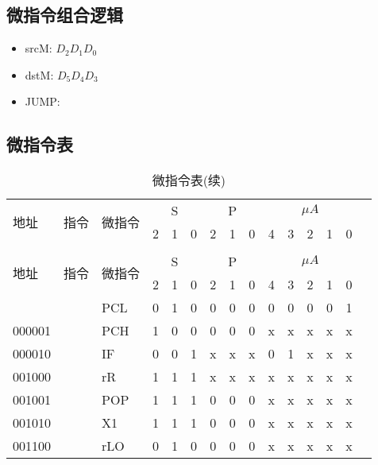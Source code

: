 \documentclass[10pt]{book}
\begin{document}
\subsection{微指令组合逻辑}
\begin{itemize}
  \item srcM: $D_{2}D_{1}D_{0}$
  \item dstM: $D_{5}D_{4}D_{3}$
  \item JUMP: 
\end{itemize}

\subsection{微指令表}
\begin{longtable}{|l|l|l|c|c|c|c|c|c|c|c|c|c|c|c|}
\caption{微指令表} \label{tb_micro_prog} \\
\hline
\multirow{2}{1cm}{地址} & \multirow{2}{1.5cm}{指令} & \multirow{2}{1.5cm}{微指令} & \multicolumn{3}{c|}{S} & \multicolumn{3}{c|}{P} & \multicolumn {5}{c|}{$\mu A$} \\
\cline{4-14}
                       &             &             & 2 & 1 & 0 & 2 & 1 & 0 & 4 & 3 & 2 & 1 & 0 \\
\hline
\endfirsthead
\caption{微指令表(续)} \\
\hline
\multirow{2}{1cm}{地址} & \multirow{2}{1.5cm}{指令} & \multirow{2}{1.5cm}{微指令} & \multicolumn{3}{c|}{S} & \multicolumn{3}{c|}{P} & \multicolumn {5}{c|}{$\mu A$} \\
\cline{4-14}
                       &             &             & 2 & 1 & 0 & 2 & 1 & 0 & 4 & 3 & 2 & 1 & 0 \\
\hline
\endhead
\hline
\endfoot
000000	&  			& PCL		& 0 & 1 & 0   & 0 & 0 & 0   & 0 & 0 & 0 & 0 & 1 \\
000001 	& 			& PCH		& 1 & 0 & 0   & 0 & 0 & 0   & x & x & x & x & x \\
000010 	& 			& IF   		& 0 & 0 & 1   & x & x & x   & 0 & 1 & x & x & x \\
001000 	& 			& rR   		& 1 & 1 & 1   & x & x & x   & x & x & x & x & x \\
001001 	& 			& POP  		& 1 & 1 & 1   & 0 & 0 & 0   & x & x & x & x & x \\
001010 	& 			& X1   		& 1 & 1 & 1   & 0 & 0 & 0   & x & x & x & x & x \\
001100 	& 			& rLO		& 0 & 1 & 0   & 0 & 0 & 0	& x & x & x & x & x \\

\end{longtable}
\end{document}
